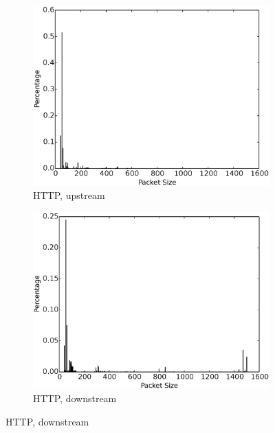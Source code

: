 \begin{figure}[h]
\begin{subfigure}{.24\linewidth}
\includegraphics[width=\linewidth]{image/http_pkt_size_upstream.eps}
\caption{HTTP, upstream}
\label{fig:http_pkt_size_upstream}
\end{subfigure}
\begin{subfigure}{.24\linewidth}
\includegraphics[width=\linewidth]{image/http_pkt_size_downstream.eps}
\caption{HTTP, downstream}
\label{fig:http_pkt_size_downstream}
\end{subfigure}

\end{figure}
